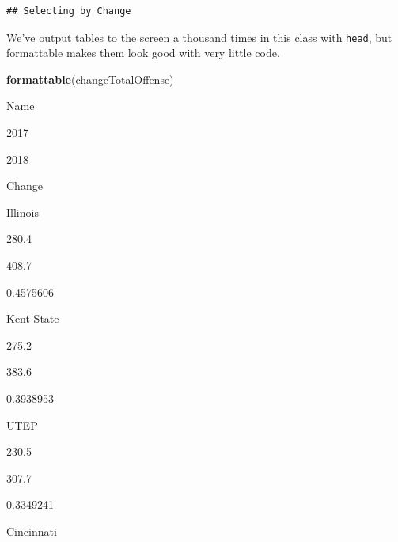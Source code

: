 \documentclass[]{book}
\newenvironment{Shaded}{\begin{snugshade}}{\end{snugshade}}
\newcommand{\KeywordTok}[1]{\textcolor[rgb]{0.13,0.29,0.53}{\textbf{#1}}}
\newcommand{\DataTypeTok}[1]{\textcolor[rgb]{0.13,0.29,0.53}{#1}}
\newcommand{\DecValTok}[1]{\textcolor[rgb]{0.00,0.00,0.81}{#1}}
\newcommand{\StringTok}[1]{\textcolor[rgb]{0.31,0.60,0.02}{#1}}
\newcommand{\OperatorTok}[1]{\textcolor[rgb]{0.81,0.36,0.00}{\textbf{#1}}}
\newcommand{\NormalTok}[1]{#1}
\begin{document}
\begin{Shaded}
\end{Shaded}

\begin{verbatim}
## Selecting by Change
\end{verbatim}

We've output tables to the screen a thousand times in this class with
\texttt{head}, but formattable makes them look good with very little
code.

\begin{Shaded}
\begin{Highlighting}[]
\KeywordTok{formattable}\NormalTok{(changeTotalOffense)}
\end{Highlighting}
\end{Shaded}

Name

2017

2018

Change

Illinois

280.4

408.7

0.4575606

Kent State

275.2

383.6

0.3938953

UTEP

230.5

307.7

0.3349241

Cincinnati
\end{document}
